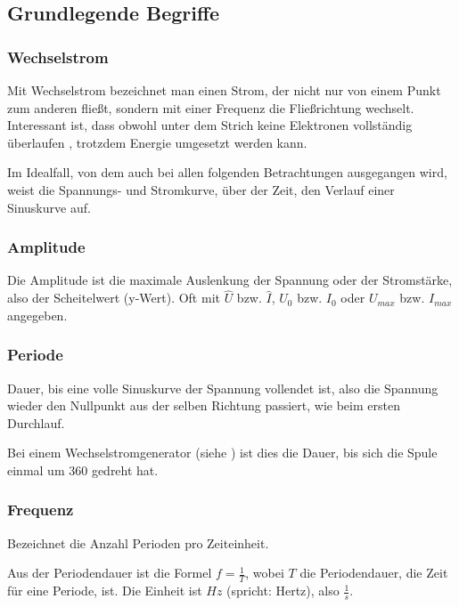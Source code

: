 \subsection{Grundlegende Begriffe}		\label{subsec:ErlaeuterungenGrundlegend}

\subsubsection{Wechselstrom}

Mit Wechselstrom bezeichnet man einen Strom, der nicht nur von einem Punkt zum anderen fließt, sondern mit einer Frequenz die Fließrichtung wechselt. Interessant ist, dass obwohl unter dem Strich keine Elektronen vollständig \glqq überlaufen\grqq{} , trotzdem Energie umgesetzt werden kann.

Im Idealfall, von dem auch bei allen folgenden Betrachtungen ausgegangen wird, weist die Spannungs- und Stromkurve, über der Zeit, den Verlauf einer Sinuskurve auf.


\subsubsection{Amplitude}

Die Amplitude ist die maximale Auslenkung der Spannung oder der Stromstärke, also der Scheitelwert (y-Wert). Oft mit $\hat{U}$ bzw. $\hat{I}$, $U_{0}$ bzw. $I_{0}$ oder $U_{max}$ bzw. $I_{max}$ angegeben.


\subsubsection{Periode}

Dauer, bis eine volle Sinuskurve der Spannung vollendet ist, also die Spannung wieder den Nullpunkt aus der selben Richtung passiert, wie beim ersten Durchlauf.

Bei einem Wechselstromgenerator (siehe ) ist dies die Dauer, bis sich die Spule einmal um 360\degree{} gedreht hat.


\subsubsection{Frequenz}

Bezeichnet die Anzahl Perioden pro Zeiteinheit. 

\noindent Aus der Periodendauer ist die Formel $f=\frac{1}{T}$, wobei $T$ die Periodendauer, die Zeit für eine Periode, ist. Die Einheit ist $Hz$ (spricht: \glqq Hertz\grqq), also $\frac{1}{s}$.



